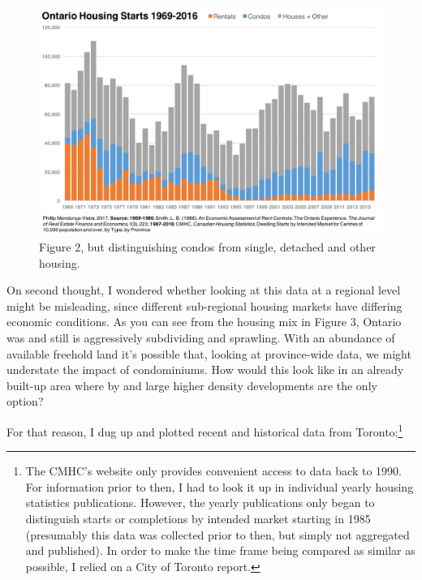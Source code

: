 \clearpage
\begin{figure}[ht]
\centering 
\includegraphics[width=\textwidth]{Ontario_Housing_Starts_1969-2016_With_Condos.png}
\caption[Ontario Housing Starts by Intended Market and Condos 1969-2016]{Figure 2, but distinguishing condos from single, detached and other housing.
}
\label{fig:figure3} 
\end{figure}

On second thought, I wondered whether looking at this data at a regional level might be misleading, since different sub-regional housing markets have differing economic conditions. As you can see from the housing mix in Figure 3, Ontario was and still is aggressively subdividing and sprawling. With an abundance of available freehold land it's possible that, looking at province-wide data, we might understate the impact of condominiums. How would this look like in an already built-up area where by and large higher density developments are the only option? 

For that reason, I dug up and plotted recent and historical data from Toronto:\footnote{\label{^note-digging} The CMHC's website only provides convenient access to data back to 1990. For information prior to then, I had to look it up in individual yearly housing statistics publications. However, the yearly publications only began to distinguish starts or completions by intended market starting in 1985 (presumably this data was collected prior to then, but simply not aggregated and published). In order to make the time frame being compared as similar as possible, I relied on a City of Toronto report.}

\clearpage

